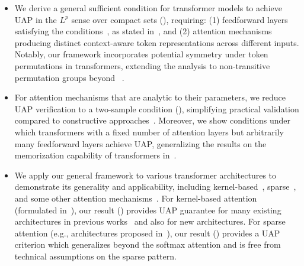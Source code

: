 \documentclass{article}
\begin{document}
\begin{itemize}
     \item We derive a general sufficient condition for
        transformer models to achieve UAP in the $L^p$ sense over compact sets (), requiring: (1) feedforward layers satisfying the conditions~\cite{cheng2025interpolation}, as stated in~, and (2) attention mechanisms producing distinct context-aware token representations across different inputs.
        Notably, our framework  incorporates potential symmetry under token permutations in transformers, extending the analysis to non-transitive permutation groups beyond
        ~\cite{li2024deep}.

        \item For attention mechanisms that are analytic to their parameters, we reduce UAP verification to a two-sample condition (), simplifying practical validation compared to constructive approaches~\cite{yun2019transformers,yun2020n,zaheer2020big,kajitsukatransformers}.
        Moreover, we show conditions under which transformers with a fixed number of attention layers but arbitrarily many feedforward layers achieve UAP, generalizing the results on the memorization capability of transformers in~\cite{kajitsukatransformers,kim2022provable}.

        \item We apply our general framework to various transformer architectures to demonstrate its generality and applicability, including kernel-based~\cite{vaswani2017attention,choromanski2020rethinking,tsai2019transformer}, sparse~\cite{beltagy2020longformer,zaheer2020big,kitaev2020reformer}, and some other attention mechanisms~\cite{wang2020linformer,chen2021skyformer}. 
        For kernel-based attention (formulated in~), our result () provides UAP guarantee for many existing architectures in previous works~\cite{vaswani2017attention,choromanski2020rethinking,tsai2019transformer} and also  for new architectures. 
        For sparse attention (e.g., architectures proposed in~\cite{beltagy2020longformer,zaheer2020big,kitaev2020reformer}), our result () provides a UAP criterion which generalizes beyond the softmax attention and
        is free from technical assumptions on the sparse pattern.


\end{itemize}
\end{document}
